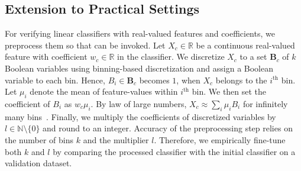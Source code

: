	\subsection{Extension to Practical Settings}\label{fvgm_sec:practical}
	For verifying linear classifiers with real-valued features and coefficients, we preprocess them so that {\fvgm} can be invoked. Let $ X_c \in \mathbb{R} $ be a continuous real-valued feature with coefficient $ w_c \in \mathbb{R} $ in the classifier. We discretize $ X_c $ to a set $ \mathbf{B}_{c} $ of $ k $ Boolean variables using binning-based discretization and assign a Boolean variable to each bin. Hence, $ B_i \in \mathbf{B}_{c} $ becomes $ 1 $, when $ X_c $ belongs to the $ i^\text{th} $ bin. Let $ \mu_i $ denote the mean of feature-values within $ i^\text{th} $ bin. We then set the coefficient of $ B_i $ as $ w_c\mu_i $. By law of large numbers, $ X_c \approx \sum_i \mu_iB_i $ for infinitely many bins~\cite{grimmett2020probability}. Finally, we multiply the coefficients of discretized variables by $ l \in \mathbb{N} \setminus \{0\} $ and round to an integer. Accuracy of the preprocessing step relies on the number of bins $ k $ and the multiplier $ l $. Therefore, we empirically fine-tune both $ k $ and $ l $ by comparing  the processed classifier with the initial classifier on a validation dataset.
\begin{comment}
	\begin{figure}
		\centering
		\subfloat[Exploration tree of stochastic sub-set sum problem.]{	\texttt{[image: figures/exploration\_tree\_DP]}\label{fvgm_fig:example_dp}}
		\subfloat[Bayesian network]{\texttt{[image: figures/example\_BN]}\label{fvgm_fig:example_BN}}
		\subfloat[Exploration tree of stochastic sub-set sum problem with Bayesian network]{\texttt{[image: figures/exploration\_tree\_DP\_BN]}	\label{fvgm_fig:example_dp_BN}
		}
		
	\end{figure}
\end{comment}


